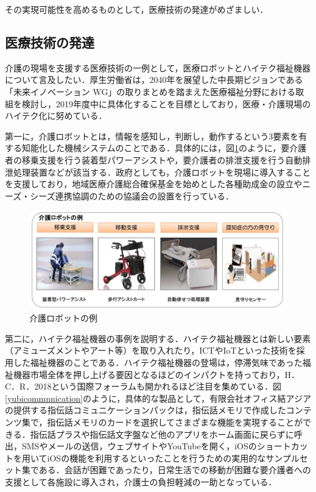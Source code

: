 その実現可能性を高めるものとして，医療技術の発達がめざましい．

\subsection{医療技術の発達}

介護の現場を支援する医療技術の一例として，医療ロボットとハイテク福祉機器について言及したい．厚生労働省は，2040年を展望した中長期ビジョンである「未来イノベーション WG」の取りまとめを踏まえた医療福祉分野における取組を検討し，2019年度中に具体化することを目標としており，医療・介護現場のハイテク化に努めている\cite{care_robots}．

第一に，介護ロボットとは，情報を感知し，判断し，動作するという3要素を有する知能化した機械システムのことである．具体的には，図\ref{care_robots}のように，要介護者の移乗支援を行う装着型パワーアシストや，要介護者の排泄支援を行う自動排泄処理装置などが該当する．政府としても，介護ロボットを現場に導入することを支援しており，地域医療介護総合確保基金を始めとした各種助成金の設立やニーズ・シーズ連携協調のための協議会の設置を行っている．

\begin{figure}[htb]
 \begin{center}
 \includegraphics[scale=0.4]{figures/care_robots}
 \caption[介護ロボットの例]{介護ロボットの例 \label{care_robots}}
 \end{center}
\end{figure}

第二に，ハイテク福祉機器の事例を説明する．ハイテク福祉機器とは新しい要素（アミューズメントやアート等）を取り入れたり，ICTやIoTといった技術を採用した福祉機器のことである．ハイテク福祉機器の登場は，停滞気味であった福祉機器市場全体を押し上げる要因となるほどのインパクトを持っており，H．C．R．2018という国際フォーラムも開かれるほど注目を集めている．図\ref{yubicommnnication}のように，具体的な製品として，有限会社オフィス結アジアの提供する指伝話コミュニケーションパックは，指伝話メモリで作成したコンテンツ集で，指伝話メモリのカードを選択してさまざまな機能を実現することができる．指伝話プラスや指伝話文字盤など他のアプリをホーム画面に戻らずに呼出，SMSやメールの送信，ウェブサイトやYouTubeを開く，iOSのショートカットを用いてiOSの機能を利用するといったことを行うための実用的なサンプルセット集である．会話が困難であったり，日常生活での移動が困難な要介護者への支援として各施設に導入され，介護士の負担軽減の一助となっている．

